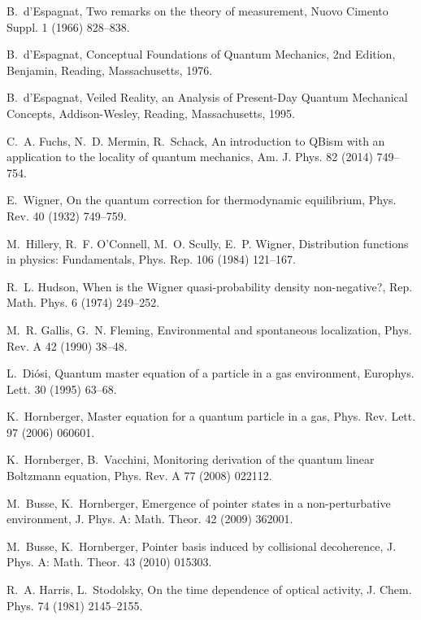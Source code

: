 \documentclass[3p,sort&compress,12pt]{elsarticle}
\begin{document}
\begin{thebibliography}{100}
B.~{d'E}spagnat, Two remarks on the theory of measurement, Nuovo Cimento Suppl.
  1 (1966) 828--838.

B.~{d'E}spagnat, Conceptual Foundations of Quantum Mechanics, 2nd Edition,
  Benjamin, Reading, Massachusetts, 1976.

B.~{d'E}spagnat, Veiled Reality, an Analysis of Present-Day Quantum Mechanical
  Concepts, Addison-Wesley, Reading, Massachusetts, 1995.

C.~A. Fuchs, N.~D. Mermin, R.~Schack, An introduction to {QBism} with an
  application to the locality of quantum mechanics, Am. J. Phys. 82 (2014)
  749--754.

E.~Wigner, On the quantum correction for thermodynamic equilibrium, Phys. Rev.
  40 (1932) 749--759.

M.~Hillery, R.~F. {O'C}onnell, M.~O. Scully, E.~P. Wigner, Distribution
  functions in physics: {F}undamentals, Phys. Rep. 106 (1984) 121--167.

R.~L. Hudson, When is the {W}igner quasi-probability density non-negative?,
  Rep. Math. Phys. 6 (1974) 249--252.

M.~R. Gallis, G.~N. Fleming, Environmental and spontaneous localization, Phys.
  Rev. A 42 (1990) 38--48.

L.~Di{\'o}si, Quantum master equation of a particle in a gas environment,
  Europhys. Lett. 30 (1995) 63--68.

K.~Hornberger, Master equation for a quantum particle in a gas, Phys. Rev.
  Lett. 97 (2006) 060601.

K.~Hornberger, B.~Vacchini, Monitoring derivation of the quantum linear
  {B}oltzmann equation, Phys. Rev. A 77 (2008) 022112.

M.~Busse, K.~Hornberger, Emergence of pointer states in a non-perturbative
  environment, J. Phys. A: Math. Theor. 42 (2009) 362001.

M.~Busse, K.~Hornberger, Pointer basis induced by collisional decoherence, J.
  Phys. A: Math. Theor. 43 (2010) 015303.

R.~A. Harris, L.~Stodolsky, On the time dependence of optical activity, J.
  Chem. Phys. 74 (1981) 2145--2155.


\end{thebibliography}
\end{document}
